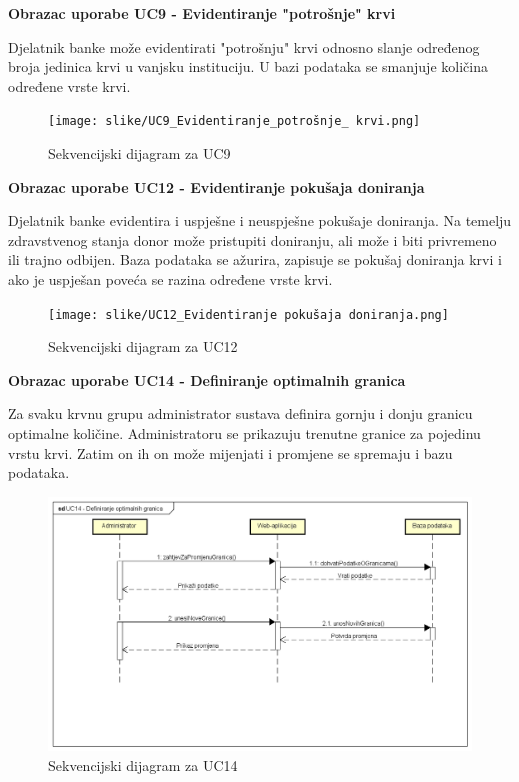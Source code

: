 \textbf{Obrazac uporabe UC9 - Evidentiranje "potrošnje" krvi}

Djelatnik banke može evidentirati "potrošnju" krvi odnosno slanje određenog broja jedinica krvi u vanjsku instituciju. U bazi podataka se smanjuje količina određene vrste krvi.

\begin{figure}[H]
	\centering
	\texttt{[image: slike/UC9\_Evidentiranje\_potrošnje\_ krvi.png]}
	\caption{Sekvencijski dijagram za UC9}
\end{figure}

\eject 
\textbf{Obrazac uporabe UC12 - Evidentiranje pokušaja doniranja}

Djelatnik banke evidentira i uspješne i neuspješne pokušaje doniranja. Na temelju zdravstvenog stanja donor može pristupiti doniranju, ali može i biti privremeno ili trajno odbijen. Baza podataka se ažurira, zapisuje se pokušaj doniranja krvi i ako je uspješan poveća se razina određene vrste krvi.

\begin{figure}[H]
	\centering
	\texttt{[image: slike/UC12\_Evidentiranje pokušaja doniranja.png]}
	\caption{Sekvencijski dijagram za UC12}
\end{figure}
\eject

\textbf{Obrazac uporabe UC14 - Definiranje optimalnih granica}

Za svaku krvnu grupu administrator sustava definira gornju i donju granicu optimalne količine. Administratoru se prikazuju trenutne granice za pojedinu vrstu krvi. Zatim on ih on može mijenjati i promjene se spremaju i bazu podataka.

\begin{figure}[H]
	\centering
	\includegraphics[width=\textwidth]{slike/UC14_Definiranje optimalnih granica.png}
	\caption{Sekvencijski dijagram za UC14}
\end{figure}
\eject

